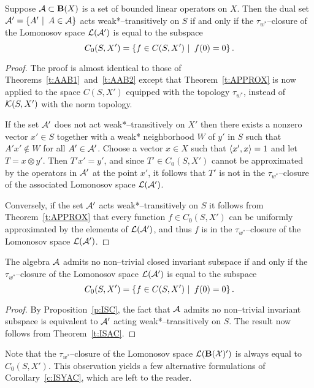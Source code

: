 \begin{thm} \label{t:ISAC}
Suppose ${\cal A}\subset{}\mathbf{B}(X)$ is a set of bounded linear operators on
$X$. Then the dual set ${\cal A}'=\left\{A'\,\,|\,\,\,A\in{\cal A}\right\}$ acts
weak*--transitively on $S$ if and only if the $\tau_{w^*}$--closure of the
Lomonosov space $\cal{L}({\cal A}')$ is equal to the subspace
\[ C_0(S,X') = \left\{f\in C(S,X')\,\,|\,\,\, f(0) = 0 \right\}. \]
\end{thm}

\begin{proof}
The proof is almost identical to those of
Theorems~\ref{t:AAB1}~and~\ref{t:AAB2} except that Theorem~\ref{t:APPROX} is
now applied to the space $C(S,X')$ equipped with the topology $\tau_{w^*}$,
instead of ${\cal K}(S,X')$ with the norm topology.

If the set ${\cal A}'$ does not act weak*--transitively on $X'$ then there exists a
nonzero vector $x' \in S$ together with a weak* neighborhood $W$ of $y'$ in
$S$ such that $A' x' \not\in W$ for all $A'\in {\cal A}'$. Choose a vector $x \in
X$ such that $\left<x',x\right>=1$ and let $T=x\otimes{}y'$. Then $T' x' = y'$, and
since $T'\in C_0(S,X')$ cannot be approximated by the operators in ${\cal A}'$ at
the point $x'$, it follows that $T'$ is not in the $\tau_{w^*}$--closure of
the associated Lomonosov space $\cal{L}({\cal A}')$.

Conversely, if the set ${\cal A}'$ acts weak*--transitively on $S$ it follows from
Theorem~\ref{t:APPROX} that every function $f\in{}C_0(S,X')$ can be uniformly
approximated by the elements of $\cal{L}({\cal A}')$, and thus $f$ is in the
$\tau_{w^*}$--closure of the Lomonosov space $\cal{L}({\cal A}')$.
\end{proof}

\begin{cor} \label{c:ISYAC}
The algebra ${\cal A}$ admits no non--trivial closed invariant subspace if and only
if the $\tau_{w^*}$--closure of the Lomonosov space $\cal{L}({\cal A}')$ is equal
to the subspace
\[ C_0(S,X') = \left\{f\in C(S,X')\,\,|\,\,\, f(0) = 0 \right\}. \]
\end{cor}

\begin{proof}
By Proposition~\ref{p:ISC}, the fact that ${\cal A}$ admits no non--trivial
invariant subspace is equivalent to ${\cal A}'$ acting weak*--transitively on $S$.
The result now follows from Theorem~\ref{t:ISAC}.
\end{proof}

\medskip

Note that the $\tau_{w^*}$--closure of the Lomonosov space
$\cal{L}(\mathbf{B}(X)')$ is always equal to $C_0(S,X')$. This observation
yields a few alternative formulations of Corollary~\ref{c:ISYAC}, which are
left to the reader.

